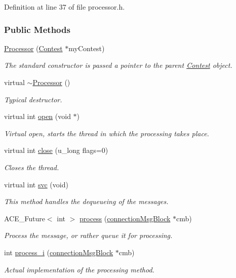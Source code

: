 Definition at line 37 of file processor.h.\subsubsection*{Public Methods}
\begin{CompactItemize}
\item 
\hyperlink{classProcessor_Processora0}{Processor} (\hyperlink{classContest}{Contest} $\ast$my\-Contest)
\begin{CompactList}\small\item\em The standard constructor is passed a pointer to the parent \hyperlink{classContest}{Contest} object.\item\end{CompactList}\item 
virtual \hyperlink{classProcessor_Processora1}{$\sim$Processor} ()
\begin{CompactList}\small\item\em Typical destructor.\item\end{CompactList}\item 
virtual int \hyperlink{classProcessor_Processora2}{open} (void $\ast$)
\begin{CompactList}\small\item\em Virtual open, starts the thread in which the processing takes place.\item\end{CompactList}\item 
virtual int \hyperlink{classProcessor_Processora3}{close} (u\_\-long flags=0)
\begin{CompactList}\small\item\em Closes the thread.\item\end{CompactList}\item 
virtual int \hyperlink{classProcessor_Processora4}{svc} (void)
\begin{CompactList}\small\item\em This method handles the dequeueing of the messages.\item\end{CompactList}\item 
ACE\_\-Future$<$ int $>$ \hyperlink{classProcessor_Processora5}{process} (\hyperlink{classconnectionMsgBlock}{connection\-Msg\-Block} $\ast$cmb)
\begin{CompactList}\small\item\em Process the message, or rather queue it for processing.\item\end{CompactList}\item 
int \hyperlink{classProcessor_Processora6}{process\_\-i} (\hyperlink{classconnectionMsgBlock}{connection\-Msg\-Block} $\ast$cmb)
\begin{CompactList}\small\item\em Actual implementation of the processing method.\item\end{CompactList}\end{CompactItemize}

